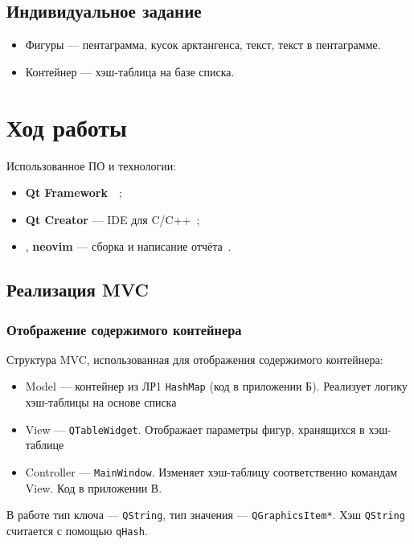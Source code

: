 \documentclass[a4paper, 14pt]{extarticle}
\begin{document}
\subsection{Индивидуальное задание}
\begin{itemize}
    \item Фигуры --- пентаграмма, кусок арктангенса, текст, текст в пентаграмме.
    \item Контейнер --- хэш-таблица на базе списка.
\end{itemize}

\section{Ход работы}
Использованное ПО и технологии:
\begin{itemize}
    \item \textbf{Qt Framework}~\cite{shlee}~\cite{qt5};
    \item \textbf{Qt Creator} --- IDE для C/C++~\cite{qtcreator};
    \item \XeLaTeX{}, \textbf{neovim} --- сборка и написание отчёта~\cite{latex}.
\end{itemize}

\subsection{Реализация MVC}
\subsubsection{Отображение содержимого контейнера}
Структура MVC, использованная для отображения содержимого контейнера:
\begin{itemize}
    \item Model --- контейнер из ЛР1 \texttt{HashMap} (код  в приложении Б). Реализует логику хэш-таблицы на основе списка
    \item View --- \texttt{QTableWidget}. Отображает параметры фигур, хранящихся в хэш-таблице
    \item Controller --- \texttt{MainWindow}. Изменяет хэш-таблицу соответственно командам View. Код в приложении В.
\end{itemize}

В работе тип ключа --- \texttt{QString}, тип значения --- \texttt{QGraphicsItem*}. Хэш \texttt{QString} считается с помощью \texttt{qHash}.
\end{document}
